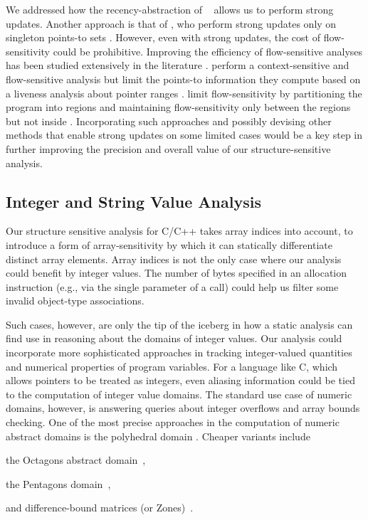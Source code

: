 We addressed how the recency-abstraction of
\citeauthor{sas/BalakrishnanR06}~\cite{sas/BalakrishnanR06} allows us
to perform strong updates.
%
Another approach is that of \citeauthor{popl/Lhotak11}, who perform
strong updates only on singleton points-to sets
\cite{popl/Lhotak11}.
%
However, even with strong updates, the cost of flow-sensitivity could
be prohibitive. Improving the efficiency of flow-sensitive analyses
has been studied extensively in the literature
\cite{sigsoft/LiCK11,sigsoft/SuiX16,ecoop/DeD12,iwmm/LiCK13}.
%
\citeauthor*{sas/KhedkerMR12} perform a context-sensitive and
flow-sensitive analysis but limit the points-to information they
compute based on a liveness analysis about pointer ranges
\cite{sas/KhedkerMR12}.
%
\citeauthor*{sas/YeSX14} limit flow-sensitivity by partitioning the
program into regions and maintaining flow-sensitivity only between the
regions but not inside \cite{sas/YeSX14}.
%
Incorporating such approaches and possibly devising other methods that
enable strong updates on some limited cases would be a key step in
further improving the precision and overall value of our
structure-sensitive analysis.


\subsection{Integer and String Value Analysis}

Our structure sensitive analysis for C/C++ takes array indices into
account, to introduce a form of array-sensitivity by which it can
statically differentiate distinct array elements. Array indices is not
the only case where our analysis could benefit by integer values. The
number of bytes specified in an allocation instruction (e.g., via the
single parameter of a  call) could help us filter some
invalid object-type associations.

Such cases, however, are only the tip of the iceberg in how a static
analysis can find use in reasoning about the domains of integer
values. Our analysis could incorporate more sophisticated approaches
in tracking integer-valued quantities and numerical properties of
program variables. For a language like C, which allows pointers to be
treated as integers, even aliasing information could be tied to
the computation of integer value domains. The standard use case of
numeric domains, however, is answering queries about integer overflows
and array bounds checking.
%
One of the most precise approaches in the computation of numeric
abstract domains is the polyhedral domain
\cite{popl/CousotH78}. Cheaper variants include
\begin{inparablank}
\item the Octagons abstract domain~\cite{journals/lisp/Mine06},
\item the Pentagons domain~\cite{sac/LogozzoF08},
\item and difference-bound matrices (or Zones)~\cite{pado/Mine01}.
\end{inparablank}


